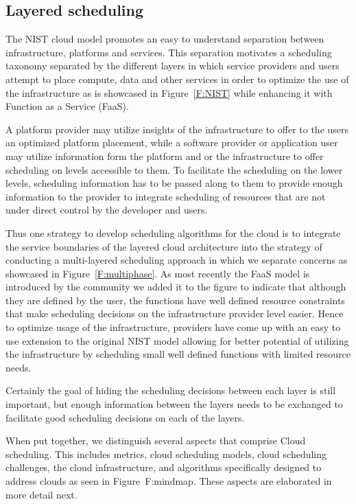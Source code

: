 \documentclass[final,5p,times,twocolumn]{elsarticle}
\begin{document}
\subsection{Layered scheduling}

The NIST cloud model promotes an easy to understand separation between
infrastructure, platforms and services. This separation motivates a
scheduling taxonomy separated by the different layers in which service
providers and users attempt to place compute, data and other services
in order to optimize the use of the infrastructure as is showcased in
Figure~\ref{F:NIST} while enhancing it with Function as a Service
(FaaS).






A platform provider may utilize insights of the infrastructure to
offer to the users an optimized platform placement, while a software
provider or application user may utilize information form the platform
and or the infrastructure to offer scheduling on levels accessible to
them. To facilitate the scheduling on the lower levels, scheduling
information has to be passed along to them to provide enough
information to the provider to integrate scheduling of resources that
are not under direct control by the developer and users.

Thus one strategy to develop scheduling algorithms for the cloud is to
integrate the service boundaries of the layered cloud architecture
into the strategy of conducting a multi-layered scheduling approach in
which we separate concerns as showcased in Figure~\ref{F:multiphase}.
As most recently the FaaS model is introduced by the community we
added it to the figure to indicate that although they are defined by
the user, the functions have well defined resource constraints that
make scheduling decisions on the infrastructure provider level easier.
Hence to optimize usage of the infrastructure, providers have come up
with an easy to use extension to the original NIST model allowing for
better potential of utilizing the infrastructure by scheduling small
well defined functions with limited resource needs.

Certainly the goal of hiding the scheduling decisions between each
layer is still important, but enough information between the layers
needs to be exchanged to facilitate good scheduling decisions on each
of the layers.

When put together, we distinguish several aspects that comprise Cloud
scheduling. This includes metrics, cloud scheduling models, cloud
scheduling challenges, the cloud infrastructure, and algorithms
specifically designed to address clouds as seen in Figure~{F:mindmap}.
These aspects are elaborated in more detail next.
\end{document}
